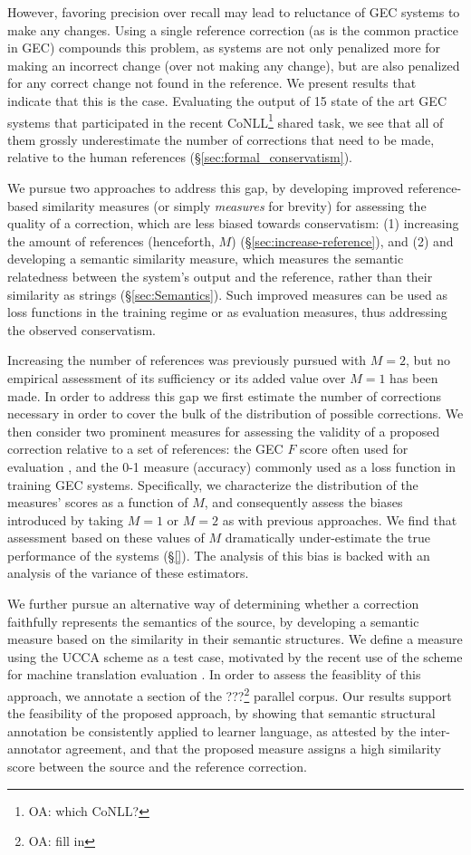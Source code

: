 \documentclass[english]{article}
\newcommand{\oa}[1]{\footnote{\color{red}OA: #1}}
\begin{document}
However, favoring precision over recall may lead to reluctance of GEC systems to make any
changes. Using a single reference correction (as is the common practice in GEC) compounds
this problem, as systems are not only penalized more for making an incorrect change (over not making
any change), but are also penalized for any correct change not found in the reference.
We present results that indicate that this is the case. Evaluating the output of 15 state of the art
GEC systems that participated in the recent CoNLL\oa{which CoNLL?} shared task, we see that all of them
grossly underestimate the number of corrections that need to be made, relative to the human references
(\S\ref{sec:formal_conservatism}). 

We pursue two approaches to address this gap, by developing improved reference-based
similarity measures (or simply {\it measures} for brevity) for assessing 
the quality of a correction, which are less biased towards conservatism:
(1) increasing the amount of references (henceforth, $M$) (\S\ref{sec:increase-reference}),
and (2) and developing a semantic similarity measure, which measures the semantic relatedness
between the system's output and the reference, rather than their similarity
as strings (\S\ref{sec:Semantics}). Such improved measures can be used as
loss functions in the training regime or as evaluation measures,
thus addressing the observed conservatism.

Increasing the number of references was previously pursued with $M=2$,
but no empirical assessment of its sufficiency or its added value over $M=1$ has been made.
In order to address this gap we first estimate the number of corrections necessary in order
to cover the bulk of the distribution of possible corrections.
We then consider two prominent measures for assessing the validity of a proposed correction
relative to a set of references: the GEC $F$ score often used for evaluation \cite{M2},
and the 0-1 measure (accuracy) commonly used as a loss function in training GEC systems.
Specifically, we characterize the distribution of the measures' scores
as a function of $M$, and consequently assess the biases introduced by taking $M=1$ or $M=2$
as with previous approaches. 
We find that assessment based on these values of $M$ dramatically under-estimate the
true performance of the systems (\S\ref{}). 
The analysis of this bias is backed with an analysis of the variance of these estimators.

We further pursue an alternative way of determining whether a correction faithfully
represents the semantics of the source, by developing a semantic measure based on the similarity
in their semantic structures. We define a measure using the UCCA scheme \cite{abend2013universal} as a
test case, motivated by the recent use of the scheme for machine translation evaluation \cite{birch2016hume}.
In order to assess the feasiblity of this approach, we annotate a section of the ???\oa{fill in}
parallel corpus. Our results support the feasibility of the proposed approach,
by showing that semantic structural annotation be consistently applied
to learner language, as attested by the inter-annotator agreement,
and that the proposed measure assigns a high similarity score between the source and the reference
correction.
\end{document}

